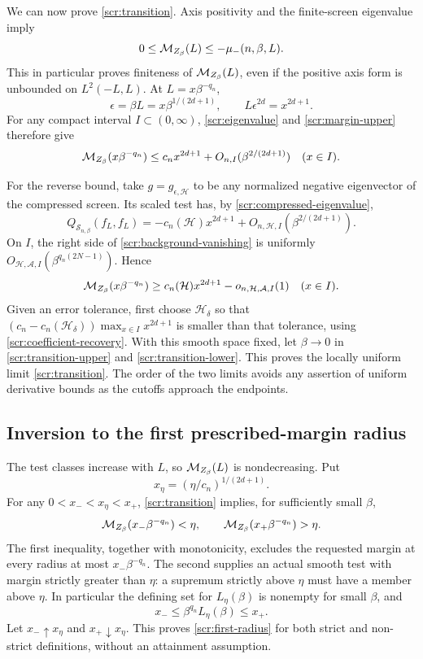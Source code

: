 We can now prove \eqref{scr:transition}. Axis positivity and
the finite-screen eigenvalue imply
\begin{equation}\label{scr:margin-upper}
 0\le\mathcal M_{Z_\beta}(L)\le-\mu_-(n,\beta,L).
\end{equation}
This in particular proves finiteness of \(\mathcal M_{Z_\beta}(L)\),
even if the positive axis form is unbounded on \(L^2(-L,L)\).
At \(L=x\beta^{-q_n}\),
\[
 \epsilon=\beta L=x\beta^{1/(2d+1)},\qquad
 L\epsilon^{2d}=x^{2d+1}.
\]
For any compact interval \(I\subset(0,\infty)\),
\eqref{scr:eigenvalue} and \eqref{scr:margin-upper} therefore
give
\begin{equation}\label{scr:transition-upper}
 \mathcal M_{Z_\beta}(x\beta^{-q_n})
    \le c_nx^{2d+1}+O_{n,I}(\beta^{2/(2d+1)})
       \quad(x\in I).
\end{equation}

For the reverse bound, take \(g=g_{\epsilon,\mathcal H}\) to
be any normalized negative eigenvector of the compressed screen.
Its scaled test has, by \eqref{scr:compressed-eigenvalue},
\[
 Q_{\mathcal S_{n,\beta}}(f_L,f_L)
   =-c_n(\mathcal H)x^{2d+1}
           +O_{n,\mathcal H,I}(\beta^{2/(2d+1)}).
\]
On \(I\), the right side of \eqref{scr:background-vanishing}
is uniformly \(O_{\mathcal H,\mathcal A,I}
(\beta^{q_n(2N-1)})\). Hence
\begin{equation}\label{scr:transition-lower}
 \mathcal M_{Z_\beta}(x\beta^{-q_n})
   \ge c_n(\mathcal H)x^{2d+1}
                -o_{n,\mathcal H,\mathcal A,I}(1)
       \quad(x\in I).
\end{equation}
Given an error tolerance, first choose \(\mathcal H_\delta\)
so that \((c_n-c_n(\mathcal H_\delta))
\max_{x\in I}x^{2d+1}\) is smaller than that tolerance,
using \eqref{scr:coefficient-recovery}. With this smooth space
fixed, let \(\beta\to0\) in \eqref{scr:transition-upper}
and \eqref{scr:transition-lower}. This proves the locally
uniform limit \eqref{scr:transition}. The order of the two
limits avoids any assertion of uniform derivative bounds as
the cutoffs approach the endpoints.

\subsection{Inversion to the first prescribed-margin radius}

The test classes increase with \(L\), so
\(\mathcal M_{Z_\beta}(L)\) is nondecreasing. Put
\[
 x_\eta=(\eta/c_n)^{1/(2d+1)}.
\]
For any \(0<x_-<x_\eta<x_+\), \eqref{scr:transition}
implies, for sufficiently small \(\beta\),
\[
 \mathcal M_{Z_\beta}(x_-\beta^{-q_n})<\eta,\qquad
 \mathcal M_{Z_\beta}(x_+\beta^{-q_n})>\eta.
\]
The first inequality, together with monotonicity, excludes the
requested margin at every radius at most \(x_-\beta^{-q_n}\).
The second supplies an actual smooth test with margin strictly
greater than \(\eta\): a supremum strictly above \(\eta\)
must have a member above \(\eta\). In particular the defining
set for \(L_\eta(\beta)\) is nonempty for small \(\beta\),
and
\[
 x_-\le\beta^{q_n}L_\eta(\beta)\le x_+.
\]
Let \(x_-\uparrow x_\eta\) and \(x_+\downarrow x_\eta\).
This proves \eqref{scr:first-radius} for both strict and
non-strict definitions, without an attainment assumption.

